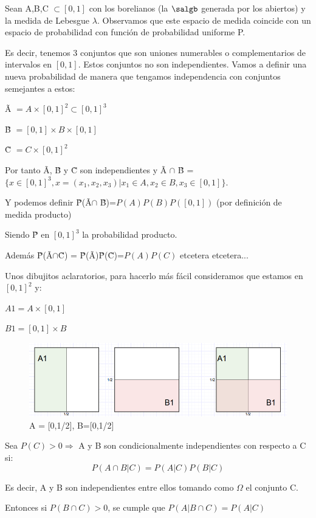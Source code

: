 \documentclass{apuntes}
\begin{document}
\begin{example}
Sean A,B,C $\subset [0,1]$ con los borelianos (la $\salgb$ generada por los abiertos) y la medida de Lebesgue $\lambda$. Observamos que este espacio de medida coincide con un espacio de probabilidad con función de probabilidad uniforme P.

Es decir, tenemos 3 conjuntos que son uniones numerables o complementarios de intervalos en $[0,1]$. Estos conjuntos no son independientes. Vamos a definir una nueva probabilidad de manera que tengamos independencia con conjuntos semejantes a estos:

\~{A} $= A\times[0,1]^2 \subset [0,1]^3$

\~{B} $= [0,1]\times B \times[0,1]$

\~{C} $= C \times[0,1]^2$

Por tanto \~{A}, \~{B} y \~{C} son independientes y \~{A} $\cap$ \~{B} = $\{x \in [0,1]^3, x=(x_1, x_2, x_3) | x_1 \in A, x_2 \in B, x_3 \in [0,1]\}$.

Y podemos definir \~{P}(\~{A}$\cap$ \~{B})=$P(A)P(B)P([0,1])$ (por definición de medida producto)

Siendo \~{P} en $[0,1]^3$ la probabilidad producto.

Además \~{P}(\~{A}$\cap$\~{C}) = \~{P}(\~{A})\~{P}(\~{C})=$P(A)P(C)$ etcetera etcetera...

Unos dibujitos aclaratorios, para hacerlo más fácil consideramos que estamos en $[0,1]^2$ y:

$A1 = A\times[0,1]$

$B1 = [0,1]\times B$

\begin{figure}[h]
\centering
\includegraphics[page=1,scale=0.545]{img/Dvenn3.png}
\caption{A = [0,1/2], B=[0,1/2]}
\end{figure}

\end{example}

\begin{defn} Sea $P(C)>0 \Rightarrow$ A y B son condicionalmente independientes con respecto a C si: 
\[
P(A\cap B|C)=P(A|C)P(B|C)
\]

Es decir, A y B son independientes entre ellos tomando como $\Omega$ el conjunto C.

Entonces si $P(B\cap C)>0$, se cumple que $P(A|B\cap C)=P(A|C)$
\end{defn}
\end{document}
